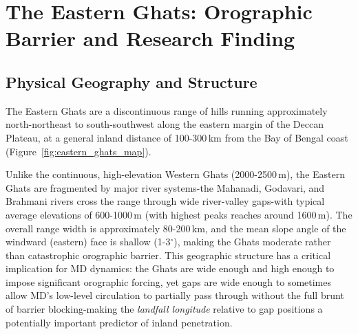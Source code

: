 %
%

\section{The Eastern Ghats: Orographic Barrier and Research Finding}
\label{sec:eastern_ghats_bg}

\subsection{Physical Geography and Structure}
\label{subsec:ghats_geography}

The Eastern Ghats are a discontinuous range of hills running
approximately north-northeast to south-southwest along the eastern
margin of the Deccan Plateau, at a general inland distance of
100-300\,km from the Bay of Bengal coast (Figure~\ref{fig:eastern_ghats_map}).

Unlike the continuous, high-elevation Western Ghats (2000-2500\,m),
the Eastern Ghats are fragmented by major river systems-the Mahanadi,
Godavari, and Brahmani rivers cross the range through wide
river-valley gaps-with typical average elevations of 600-1000\,m
(with highest peaks reaches around 1600\,m). The overall range width
is approximately 80-200\,km, and the mean slope angle of the windward
(eastern) face is shallow (1-3$^\circ$), making the Ghats moderate
rather than catastrophic orographic barrier. This geographic
structure has a critical implication for MD dynamics: the Ghats are
wide enough and high enough to impose significant orographic forcing,
yet gaps are wide enough to sometimes allow MD's low-level
circulation to partially pass through without the full brunt of
barrier blocking-making the \emph{landfall longitude} relative to gap
positions a potentially important predictor of inland penetration.

